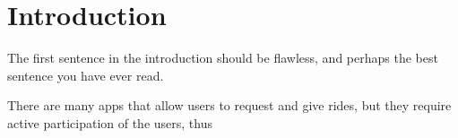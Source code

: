 \chapter{Introduction}\label{ch:introduction}

The first sentence in the introduction should be flawless, and perhaps the best sentence you have ever read.

There are many apps that allow users to request and give rides, but they require active participation of the users, thus 

